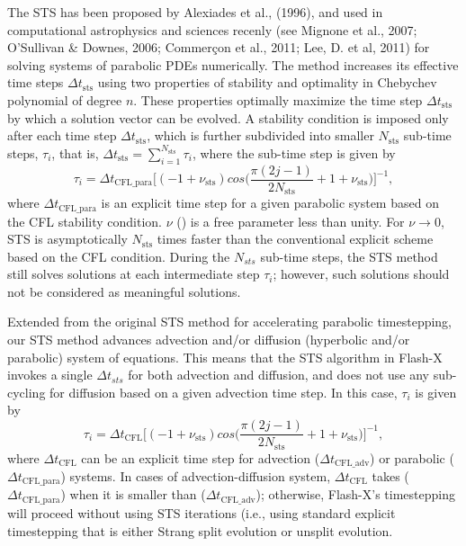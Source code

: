 The STS has been proposed by Alexiades et al., (1996), and used in computational astrophysics and sciences recenly
(see Mignone et al., 2007; O'Sullivan \& Downes, 2006; Commer\c{c}on et al., 2011; Lee, D. et al, 2011)
for solving systems of parabolic PDEs numerically.  The method increases its effective time steps $\Delta t_{\mbox{sts}}$
using two properties of stability and optimality in
Chebychev polynomial of degree $n$.  These properties optimally
maximize the time step $\Delta t_{\mbox{sts}}$ by which a solution vector can be
evolved. A stability condition is imposed only after each time 
step $\Delta t_{\mbox{sts}}$, which is further subdivided into smaller $N_{\mbox{sts}}$
sub-time steps, $\tau_i$,\; that is, $\Delta t_{\mbox{sts}}=\sum^{N_{\mbox{sts}}}_{i=1} \tau_i$, where
the sub-time step is given by
\begin{equation}
\tau_i=\Delta t_{\mbox{CFL\_para}}\big[ (-1+\nu_{\mbox{sts}}) cos\big(\frac{\pi(2j-1)}{2N_{\mbox{sts}}}  + 1+\nu_{\mbox{sts}}  \big)\big]^{-1},
\label{eqn:STS_original}
\end{equation}
where $\Delta t_{\mbox{CFL\_para}}$ is an explicit time step for a given parabolic system based on the CFL stability
condition. $\nu$ () is a free parameter less than unity. For $\nu \rightarrow 0$, STS is asymptotically
$N_{\mbox{sts}}$ times faster than the conventional explicit scheme based on the CFL condition.
During the $N_{sts}$ sub-time steps, the STS method still solves 
solutions at each intermediate step $\tau_i$; however, 
such solutions should not be considered as meaningful solutions.

Extended from the original STS method for accelerating parabolic timestepping, 
our STS method advances advection and/or diffusion (hyperbolic and/or parabolic) system of equations. 
This means that the STS algorithm in Flash-X invokes
a single $\Delta t_{sts}$ for both advection and diffusion,
and does not use any sub-cycling for diffusion based on a given advection time step.  
In this case, $\tau_i$ is given by
\begin{equation}
\tau_i=\Delta t_{\mbox{CFL}}\big[ (-1+\nu_{\mbox{sts}}) cos\big(\frac{\pi(2j-1)}{2N_{\mbox{sts}}}  + 1+\nu_{\mbox{sts}} \big)\big]^{-1},
\label{eqn:STS_flash}
\end{equation}
where $\Delta t_{\mbox{CFL}}$ can be an explicit time step for advection ($\Delta t_{\mbox{CFL\_adv}}$) 
or parabolic ($\Delta t_{\mbox{CFL\_para}}$) systems.
In cases of advection-diffusion system, $\Delta t_{\mbox{CFL}}$ takes ($\Delta t_{\mbox{CFL\_para}}$) when it is smaller
than ($\Delta t_{\mbox{CFL\_adv}}$); otherwise, Flash-X's timestepping will proceed without using STS iterations (i.e.,
using standard explicit timestepping that is either Strang split evolution or unsplit evolution.


